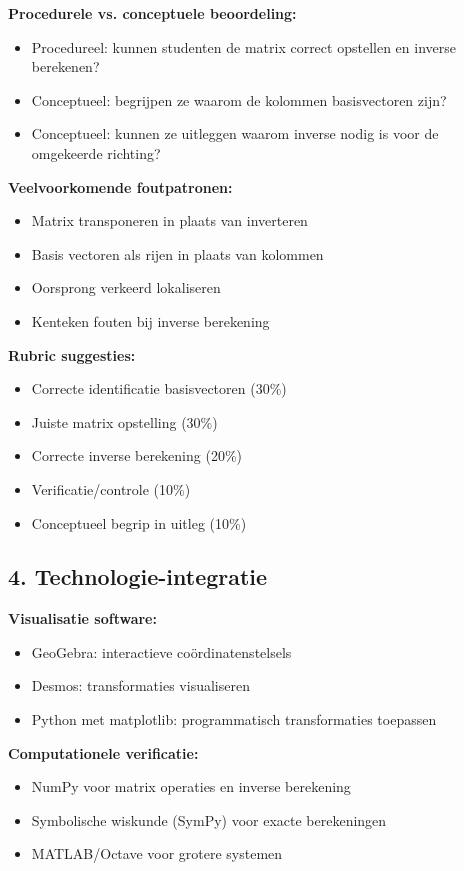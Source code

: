 \documentclass{ximera}
\begin{document}
\textbf{Procedurele vs. conceptuele beoordeling:}
\begin{itemize}
\item Procedureel: kunnen studenten de matrix correct opstellen en inverse berekenen?
\item Conceptueel: begrijpen ze waarom de kolommen basisvectoren zijn?
\item Conceptueel: kunnen ze uitleggen waarom inverse nodig is voor de omgekeerde richting?
\end{itemize}

\textbf{Veelvoorkomende foutpatronen:}
\begin{itemize}
\item Matrix transponeren in plaats van inverteren
\item Basis vectoren als rijen in plaats van kolommen
\item Oorsprong verkeerd lokaliseren
\item Kenteken fouten bij inverse berekening
\end{itemize}

\textbf{Rubric suggesties:}
\begin{itemize}
\item Correcte identificatie basisvectoren (30\%)
\item Juiste matrix opstelling (30\%)
\item Correcte inverse berekening (20\%)
\item Verificatie/controle (10\%)
\item Conceptueel begrip in uitleg (10\%)
\end{itemize}

\subsection*{4. Technologie-integratie}

\textbf{Visualisatie software:}
\begin{itemize}
\item GeoGebra: interactieve coördinatenstelsels
\item Desmos: transformaties visualiseren
\item Python met matplotlib: programmatisch transformaties toepassen
\end{itemize}

\textbf{Computationele verificatie:}
\begin{itemize}
\item NumPy voor matrix operaties en inverse berekening
\item Symbolische wiskunde (SymPy) voor exacte berekeningen
\item MATLAB/Octave voor grotere systemen
\end{itemize}
\end{document}
